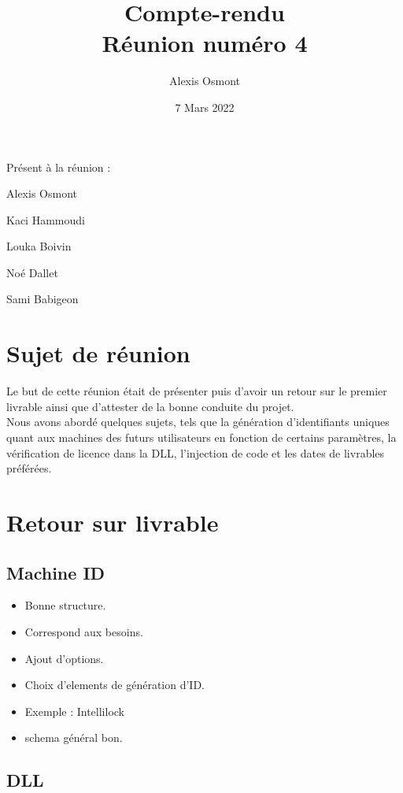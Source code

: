\documentclass{article}
\title{
    \Huge
    Compte-rendu\\
    Réunion numéro 4\\
}
\date{\huge 7 Mars 2022}
\author{\huge Alexis Osmont\\}
\begin{document}
\maketitle
\vspace{5cm}
    Présent à la réunion :
    \begin{description}
        \item Alexis Osmont
        \item Kaci Hammoudi
        \item Louka  Boivin
        \item Noé Dallet
        \item Sami Babigeon
    \end{description}
\newpage

\section{Sujet de réunion}   

Le but de cette réunion était de présenter puis d'avoir un retour sur le premier livrable ainsi que d'attester de la bonne conduite du projet.\\

Nous avons abordé quelques sujets, tels que la génération d'identifiants uniques quant aux machines des futurs utilisateurs en fonction de certains paramètres, la vérification de licence dans la DLL, l'injection de code et les dates de livrables préférées. 
\vspace{0.5cm}

\section{Retour sur livrable}
\subsection{Machine ID}

\begin{itemize}
    \item Bonne structure. 
    \item Correspond aux besoins.
    \item Ajout d'options.
    \item Choix d'elements de génération d'ID. 
    \item Exemple : Intellilock
    \item schema général bon.
\end{itemize}

\subsection{DLL}
\end{document}
